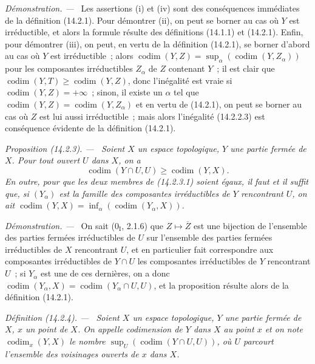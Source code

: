 \documentclass[10pt,oneside]{book}
\makeatletter
\newcommand{\setmanualcurrentlabel}[1]{\def\@currentlabel{#1}}
\newenvironment{definition}[1][]{%
  \setmanualcurrentlabel{#1}\par\medskip\noindent\itshape Définition (#1). ---\ }{\par}
\newenvironment{proposition}[1][]{%
  \setmanualcurrentlabel{#1}\par\medskip\noindent\itshape Proposition (#1). ---\ }{\par}
\newenvironment{proof}{%
  \par\medskip\noindent\textit{Démonstration. ---\ }}{\par}
\makeatother
\begin{document}
\begin{proof}
Les assertions (i) et (iv) sont des conséquences immédiates de la définition
(14.2.1). Pour démontrer (ii), on peut se borner au cas où $Y$ est
irréductible, et alors la formule résulte des définitions (14.1.1) et
(14.2.1). Enfin, pour démontrer (iii), on peut, en vertu de la définition
(14.2.1), se borner d'abord au cas où $Y$ est irréductible~; alors
$\operatorname{codim}(Y,Z)=
\sup_\alpha(\operatorname{codim}(Y,Z_\alpha))$ pour les composantes
irréductibles $Z_\alpha$ de $Z$ contenant $Y$~; il est clair que
$\operatorname{codim}(Y,T)\geq\operatorname{codim}(Y,Z)$, donc l'inégalité
est vraie si $\operatorname{codim}(Y,Z)=+\infty$~; sinon, il existe un
$\alpha$ tel que
$\operatorname{codim}(Y,Z)=\operatorname{codim}(Y,Z_\alpha)$ et en vertu de
(14.2.1), on peut se borner au cas où $Z$ est lui aussi irréductible~; mais
alors l'inégalité (14.2.2.3) est conséquence évidente de la définition
(14.2.1).
\end{proof}

\begin{proposition}[14.2.3]
\label{0.14.2.3-fr}
Soient $X$ un espace topologique, $Y$ une partie fermée de $X$. Pour tout
ouvert $U$ dans $X$, on a
\[
  \operatorname{codim}(Y\cap U,U)\geq\operatorname{codim}(Y,X).
  \tag{14.2.3.1}\label{0.14.2.3.1-fr}
\]
En outre, pour que les deux membres de (14.2.3.1) soient égaux, il faut et il
suffit que, si $(Y_\alpha)$ est la famille des composantes irréductibles de
$Y$ rencontrant $U$, on ait
$\operatorname{codim}(Y,X)=
\inf_\alpha(\operatorname{codim}(Y_\alpha,X))$.
\end{proposition}

\begin{proof}
On sait ($0_{\mathrm I}$, 2.1.6) que $Z\mapsto\overline Z$ est une bijection
de l'ensemble des parties fermées irréductibles de $U$ sur l'ensemble des
parties fermées irréductibles de $X$ rencontrant $U$, et en particulier fait
correspondre aux composantes irréductibles de $Y\cap U$ les composantes
irréductibles de $Y$ rencontrant $U$~; si $Y_\alpha$ est une de ces
dernières, on a donc
$\operatorname{codim}(Y_\alpha,X)=
\operatorname{codim}(Y_\alpha\cap U,U)$, et la proposition résulte alors de
la définition (14.2.1).
\end{proof}

\begin{definition}[14.2.4]
\label{0.14.2.4-fr}
Soient $X$ un espace topologique, $Y$ une partie fermée de $X$, $x$ un point
de $X$. On appelle \emph{codimension de $Y$ dans $X$ au point $x$} et on note
$\operatorname{codim}_x(Y,X)$ le nombre
$\sup_U(\operatorname{codim}(Y\cap U,U))$, où $U$ parcourt l'ensemble des
voisinages ouverts de $x$ dans $X$.
\end{definition}
\end{document}
